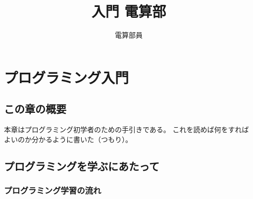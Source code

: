 \documentclass[lualatex,ja=standard,12pt,a4j]{bxjsbook}
\title{入門 電算部}
\author{電算部員}
\begin{document}
	\tableofcontents
	\chapter{プログラミング入門}
		\section{この章の概要}
                本章はプログラミング初学者のための手引きである。
                これを読めば何をすればよいのか分かるように書いた（つもり）。
                
		\section{プログラミングを学ぶにあたって}
			\subsection{プログラミング学習の流れ}
\end{document}

